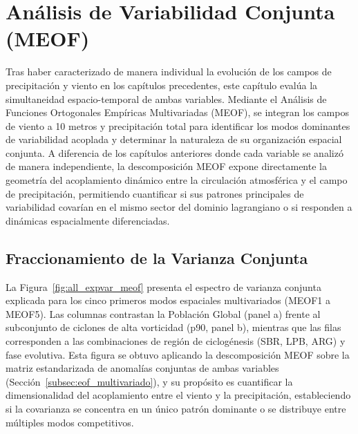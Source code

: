 \chapter{Análisis de Variabilidad Conjunta (MEOF)}
\label{chap:meof}

Tras haber caracterizado de manera individual la evolución de los campos de precipitación y viento en los capítulos precedentes, este capítulo evalúa la simultaneidad espacio-temporal de ambas variables. 
Mediante el Análisis de Funciones Ortogonales Empíricas Multivariadas (MEOF), se integran los campos de viento a 10 metros y precipitación total para identificar los modos dominantes de variabilidad acoplada y determinar la naturaleza de su organización espacial conjunta. 
A diferencia de los capítulos anteriores donde cada variable se analizó de manera independiente, la descomposición MEOF expone directamente la geometría del acoplamiento dinámico entre la circulación atmosférica y el campo de precipitación, permitiendo cuantificar si sus patrones principales de variabilidad covarían en el mismo sector del dominio lagrangiano o si responden a dinámicas espacialmente diferenciadas.

\section{Fraccionamiento de la Varianza Conjunta}
\label{sec:meof_varianza}

La Figura~\ref{fig:all_expvar_meof} presenta el espectro de varianza conjunta explicada para los cinco primeros modos espaciales multivariados (MEOF1 a MEOF5). 
Las columnas contrastan la Población Global (panel a) frente al subconjunto de ciclones de alta vorticidad (p90, panel b), mientras que las filas corresponden a las combinaciones de región de ciclogénesis (SBR, LPB, ARG) y fase evolutiva. 
Esta figura se obtuvo aplicando la descomposición MEOF sobre la matriz estandarizada de anomalías conjuntas de ambas variables (Sección~\ref{subsec:eof_multivariado}), y su propósito es cuantificar la dimensionalidad del acoplamiento entre el viento y la precipitación, estableciendo si la covarianza se concentra en un único patrón dominante o se distribuye entre múltiples modos competitivos.

